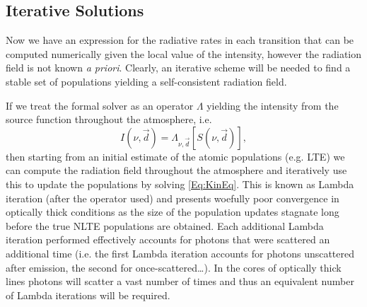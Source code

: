 \subsection{Iterative Solutions}

Now we have an expression for the radiative rates in each transition that can be computed numerically given the local value of the intensity, however the radiation field is not known \textit{a priori}.
Clearly, an iterative scheme will be needed to find a stable set of populations yielding a self-consistent radiation field.

If we treat the formal solver as an operator $\Lambda$ yielding the intensity from the source function throughout the atmosphere, i.e.
\begin{equation}
    I(\nu, \vec{d}) = \Lambda_{\nu,\vec{d}}[S(\nu, \vec{d})],
    \label{Eq:LambdaOperator}
\end{equation}
then starting from an initial estimate of the atomic populations (e.g. LTE) we can compute the radiation field throughout the atmosphere and iteratively use this to update the populations by solving \eqref{Eq:KinEq}. This is known as Lambda iteration (after the operator used) and presents woefully poor convergence in optically thick conditions as the size of the population updates stagnate long before the true NLTE populations are obtained.
Each additional Lambda iteration performed effectively accounts for photons that were scattered an additional time (i.e. the first Lambda iteration accounts for photons unscattered after emission, the second for once-scattered\ldots).
In the cores of optically thick lines photons will scatter a vast number of times and thus an equivalent number of Lambda iterations will be required.

